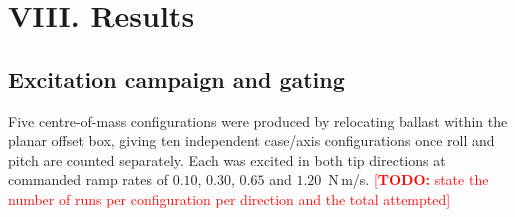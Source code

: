 \documentclass[10pt]{article}
\newcommand{\pl}[1]{\textcolor{blue}{(#1)}}
\begin{document}
\providecommand{\labelX}{}
\def\eqpivotfree{}
%
%
%

\newcommand{\TODO}[1]{\textcolor{red}{[\textbf{TODO:} #1]}}

\section*{VIII. Results}

\subsection*{Excitation campaign and gating}

Five centre-of-mass configurations were produced by relocating ballast
within the planar offset box, giving ten independent case/axis
configurations once roll and pitch are counted separately. Each was
excited in both tip directions at commanded ramp rates of $0.10$,
$0.30$, $0.65$ and $1.20$~N\,m/s. \TODO{state the number of runs per
configuration per direction and the total attempted}
\end{document}
